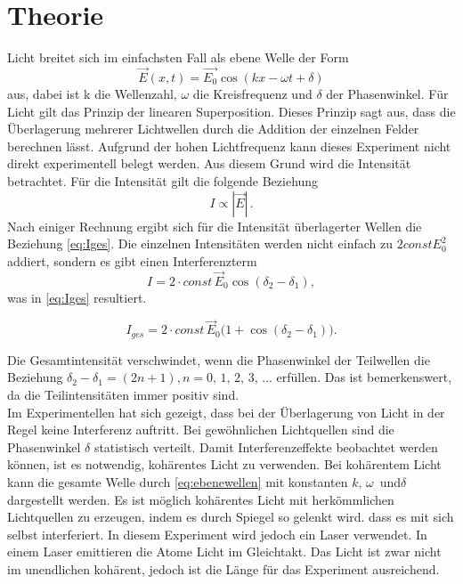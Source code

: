 \section{Theorie}
\label{sec:theorie}


Licht breitet sich im einfachsten Fall als ebene Welle der Form 
\begin{equation}
    \vec{E}(x,t) = \vec{E_0} \cos{(kx - \omega t + \delta)}
    \label{eq:ebenewellen}
\end{equation}
aus, dabei ist k die Wellenzahl, $\omega$ die Kreisfrequenz und $\delta$ der Phasenwinkel. Für Licht gilt das Prinzip der linearen Superposition. Dieses Prinzip sagt aus, dass die Überlagerung mehrerer Lichtwellen durch die Addition der einzelnen Felder berechnen lässt.
Aufgrund der hohen Lichtfrequenz kann dieses Experiment nicht direkt experimentell belegt werden. Aus diesem Grund wird die Intensität betrachtet. Für die Intensität gilt die folgende Beziehung 
\begin{equation*}
    I \propto |\vec{E}| \, .
\end{equation*}
Nach einiger Rechnung ergibt sich für die Intensität überlagerter Wellen die Beziehung \eqref{eq:Iges}. Die einzelnen Intensitäten werden nicht einfach zu $2 const E_{0}^{2}$ addiert, sondern es gibt einen Interferenzterm
\begin{equation*}
    I = 2 \cdot const \, \vec{E}_0 \cos{(\delta_2 - \delta_1)}, 
\end{equation*}
was in \eqref{eq:Iges} resultiert.

\begin{equation}
    I_{ges} = 2 \cdot const \, \vec{E}_0 (1 + \cos{(\delta_2 - \delta_1))}. 
    \label{eq:Iges}
\end{equation}

Die Gesamtintensität verschwindet, wenn die Phasenwinkel der Teilwellen die Beziehung $ \delta_2 - \delta_1 = (2n + 1) , n = 0, \, 1, \, 2, \, 3, \, ...$ erfüllen. 
Das ist bemerkenswert, da die Teilintensitäten immer positiv sind. \\

Im Experimentellen hat sich gezeigt, dass bei der Überlagerung von Licht in der Regel keine Interferenz auftritt. 
Bei gewöhnlichen Lichtquellen sind die Phasenwinkel $ \delta $ statistisch verteilt. Damit Interferenzeffekte beobachtet werden können, ist es notwendig, kohärentes Licht zu verwenden.
Bei kohärentem Licht kann die gesamte Welle durch \eqref{eq:ebenewellen} mit konstanten $k, \, \omega \, $ und$ \delta $ dargestellt werden.
Es ist möglich kohärentes Licht mit herkömmlichen Lichtquellen zu erzeugen, indem es durch Spiegel so gelenkt wird. dass es mit sich selbst interferiert.
In diesem Experiment wird jedoch ein Laser verwendet. In einem Laser emittieren die Atome Licht im Gleichtakt. Das Licht ist zwar nicht im unendlichen kohärent, jedoch ist die Länge für das Experiment ausreichend.\\


